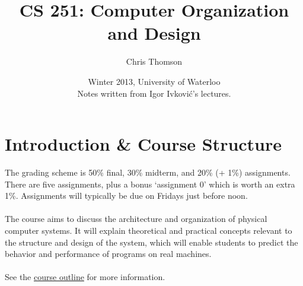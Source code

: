 \documentclass[]{article}
\newcommand{\lecture}[1]{\marginpar{{\footnotesize $\leftarrow$ \underline{#1}}}}
\begin{document}
	\title{\bf{CS 251: Computer Organization and Design}}
	\date{Winter 2013, University of Waterloo \\ \center Notes written from Igor Ivkovi\'c's lectures.}
	\author{Chris Thomson}
	\maketitle
	\newpage

	\section{Introduction \& Course Structure} \lecture{January 7, 2013}
		The grading scheme is 50\% final, 30\% midterm, and 20\% (+ 1\%) assignments. There are five assignments, plus a bonus `assignment 0' which is worth an extra 1\%. Assignments will typically be due on Fridays just before noon. 
		\\ \\
		The course aims to discuss the architecture and organization of physical computer systems. It will explain theoretical and practical concepts relevant to the structure and design of the system, which will enable students to predict the behavior and performance of programs on real machines.
		\\ \\
		See the \href{https://www.student.cs.uwaterloo.ca/~cs251/W13/outline.html}{course outline} for more information.
\end{document}
